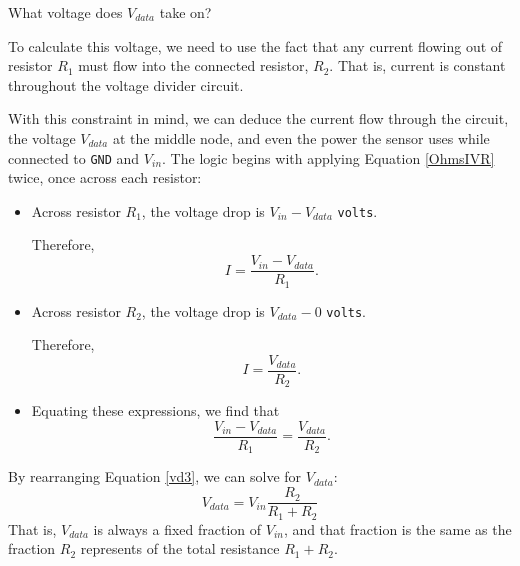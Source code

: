 What voltage does $V_{data}$ take on?

To calculate this voltage, we need to use the fact that any current flowing out of resistor $R_1$ must flow into the connected resistor, $R_2$.
That is, current is constant throughout the voltage divider circuit. 

With this constraint in mind, we can deduce the current flow through the circuit, the voltage $V_{data}$ at the middle node, and even the power the sensor uses while connected to \texttt{GND} and $V_{in}$.
The logic begins with applying Equation \ref{OhmsIVR} twice, once across each resistor:
\begin{itemize}
	\item Across resistor $R_1$, the voltage drop is $V_{in}-V_{data}$ \texttt{volts}.
	
	Therefore,
	\begin{equation}\label{vd1}
	I = \frac{V_{in}-V_{data}}{R_1}.
	\end{equation}	
	\item Across resistor $R_2$, the voltage drop is $V_{data}-0$ \texttt{volts}.
	
	Therefore,
	\begin{equation}\label{vd2}
	I = \frac{V_{data}}{R_2}.
	\end{equation}
	\item Equating these expressions, we find that 	
	\begin{equation}\label{vd3}
	\frac{V_{in}-V_{data}}{R_1} = \frac{V_{data}}{R_2}.
	\end{equation}
\end{itemize}
By rearranging Equation \ref{vd3}, we can solve for $V_{data}$:
\begin{equation}\label{vd4}
V_{data} = V_{in} \frac{R_2}{R_1+R_2}
\end{equation}
That is, $V_{data}$ is always a fixed fraction of $V_{in}$, and that fraction is the same as the fraction $R_2$ represents of the total resistance $R_1+R_2$. 

